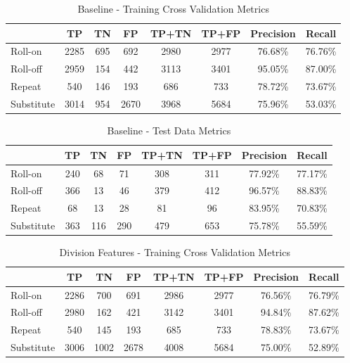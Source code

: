\documentclass[letterpaper, 10 pt, conference]{ieeeconf}  %
\begin{document}
\begin{table}[h]
\begin{center}
\begin{tabular}{|l|c|c|c|c|c|c|c|} \hline
& TP & TN & FP & TP+TN & TP+FP & Precision & Recall \\ \hline
Roll-on & 2285 & 695 & 692 & 2980 & 2977 & 76.68\% & 76.76\% \\ \hline
Roll-off & 2959 & 154 & 442 & 3113 & 3401 & 95.05\% & 87.00\% \\ \hline
Repeat & 540 & 146 & 193 & 686 & 733 & 78.72\% & 73.67\% \\ \hline
Substitute & 3014 & 954 & 2670 & 3968 & 5684 & 75.96\% & 53.03\% \\ \hline
\end{tabular}
\caption{Baseline - Training Cross Validation Metrics}
\label{table:basecvm}
\end{center}
\end{table}

\begin{table}[h]
\begin{center}
\begin{tabular}{|l|c|c|c|c|c|c|c|} \hline
& TP & TN & FP & TP+TN & TP+FP & Precision & Recall \\ \hline
Roll-on & 240 & 68 & 71 & 308 & 311 & 77.92\% & 77.17\% \\ \hline
Roll-off & 366 & 13 & 46 & 379 & 412 & 96.57\% & 88.83\% \\ \hline
Repeat & 68 & 13 & 28 & 81 & 96 & 83.95\% & 70.83\% \\ \hline
Substitute & 363 & 116 & 290 & 479 & 653 & 75.78\% & 55.59\% \\ \hline
\end{tabular}
\caption{Baseline - Test Data Metrics}
\label{table:basetdm}
\end{center}
\end{table}

\begin{table}[h]
\begin{center}
\begin{tabular}{|l|c|c|c|c|c|c|c|} \hline
& TP & TN & FP & TP+TN & TP+FP & Precision & Recall \\ \hline
Roll-on & 2286 & 700 & 691 & 2986 & 2977 & 76.56\% & 76.79\% \\ \hline
Roll-off & 2980 & 162 & 421 & 3142 & 3401 & 94.84\% & 87.62\% \\ \hline
Repeat & 540 & 145 & 193 & 685 & 733 & 78.83\% & 73.67\% \\ \hline
Substitute & 3006 & 1002 & 2678 & 4008 & 5684 & 75.00\% & 52.89\% \\ \hline
\end{tabular}
\caption{Division Features - Training Cross Validation Metrics}
\label{table:divisioncvm}
\end{center}
\end{table}
\end{document}
